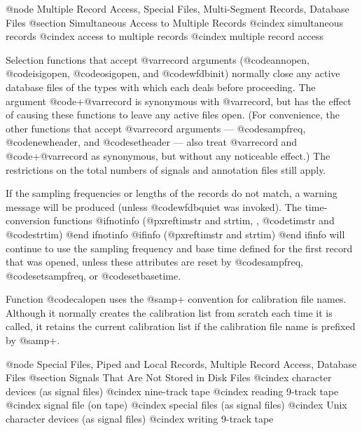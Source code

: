 {{{{{{{{{@node     Multiple Record Access, Special Files, Multi-Segment Records, Database Files
@section Simultaneous Access to Multiple Records
@cindex simultaneous records
@cindex access to multiple records
@cindex multiple record access

Selection functions that accept @var{record} arguments (@code{annopen},
@code{isigopen}, @code{osigopen}, and @code{wfdbinit}) normally close any
active database files of the types with which each deals before
proceeding.  The argument @code{+}@var{record} is synonymous with
@var{record}, but has the effect of causing these functions to leave any
active files open.  (For convenience, the other functions that accept
@var{record} arguments --- @code{sampfreq}, @code{newheader}, and
@code{setheader} --- also treat @var{record} and @code{+}@var{record} as
synonymous, but without any noticeable effect.)  The restrictions on the
total numbers of signals and annotation files still apply.

If the sampling frequencies or lengths of the records do not match, a warning
message will be produced (unless @code{wfdbquiet} was invoked).  The
time-conversion functions
@ifnotinfo
(@pxref{timstr and strtim, , @code{timstr} and @code{strtim}})
@end ifnotinfo
@ifinfo
(@pxref{timstr and strtim})
@end ifinfo
will continue to use the sampling frequency and base
time defined for the first record that was opened, unless these
attributes are reset by @code{sampfreq}, @code{setsampfreq}, or
@code{setbasetime}.

Function @code{calopen} uses the @samp{+} convention for calibration
file names.  Although it normally creates the calibration list from
scratch each time it is called, it retains the current calibration list
if the calibration file name is prefixed by @samp{+}.

@node     Special Files, Piped and Local Records, Multiple Record Access, Database Files
@section Signals That Are Not Stored in Disk Files
@cindex character devices (as signal files)
@cindex nine-track tape
@cindex reading 9-track tape
@cindex signal file (on tape)
@cindex special files (as signal files)
@cindex Unix character devices (as signal files)
@cindex writing 9-track tape

}}}}}}}}}
